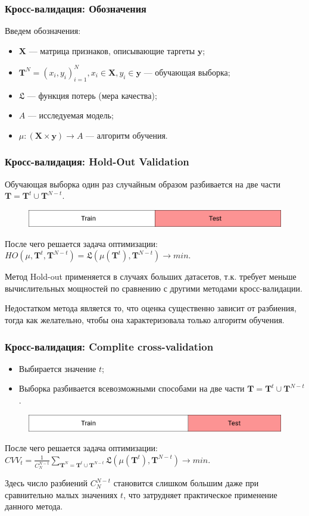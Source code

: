 \documentclass[11pt]{beamer}
\begin{document}
	\begin{frame}
		\frametitle{Кросс-валидация: Обозначения}
		Введем обозначения:
		\begin{itemize}
			\item $\bm{X}$ --- матрица признаков, описывающие таргеты $\bm{y}$;
			\item $\bm{T}^N = (x_i, y_i)_{i=1}^N, x_i \in \bm{X}, y_i \in \bm{y}$ --- обучающая выборка;
			\item $\mathfrak{L}$ --- функция потерь (мера качества);
			\item $A$ --- исследуемая модель;
			\item $\mu : (\bm{X}\times\bm{y})\rightarrow A$ --- алгоритм обучения.
		\end{itemize}
	\end{frame}
	\begin{frame}
		\frametitle{Кросс-валидация: Hold-Out Validation}
		Обучающая выборка один раз случайным образом разбивается на две части $\bm{T} = \bm{T}^t \cup \bm{T}^{N-t}$.
		\begin{figure}
			\includegraphics[width=0.9\linewidth]{../Report/imgs/hold-out}
		\end{figure}
		После чего решается задача оптимизации:
		$HO(\mu, \bm{T}^t, \bm{T}^{N-t}) = \mathfrak{L}(\mu(\bm{T}^t), \bm{T}^{N-t}) \rightarrow min$.
		
		
		Метод Hold-out применяется в случаях больших датасетов, т.к. требует меньше вычислительных мощностей по сравнению с другими методами кросс-валидации. 
		
		Недостатком метода является то, что оценка существенно зависит от разбиения, тогда как желательно, чтобы она характеризовала только алгоритм обучения.
	\end{frame}

	\begin{frame}
		\frametitle{Кросс-валидация: Complite cross-validation}
		\begin{itemize}
			\item Выбирается значение $t$;
			\item Выборка разбивается всевозможными способами на две части $\bm{T} = \bm{T}^t \cup \bm{T}^{N-t}$.
		\end{itemize}
		\begin{figure}
			\includegraphics[width=0.9\linewidth]{../Report/imgs/completecrossvalidation}
		\end{figure}
		После чего решается задача оптимизации:
		$CVV_t = \frac{1}{C_N^{N-t}}\sum\limits_{\bm{T}^N = \bm{T}^t \cup \bm{T}^{N-t}} \mathfrak{L}(\mu(\bm{T}^t), \bm{T}^{N-t}) \rightarrow min$.
		
		
		Здесь число разбиений $ C_N^{N-t} $ становится слишком большим даже при сравнительно малых значениях $ t $, что затрудняет практическое применение данного метода.
	\end{frame}
\end{document}
